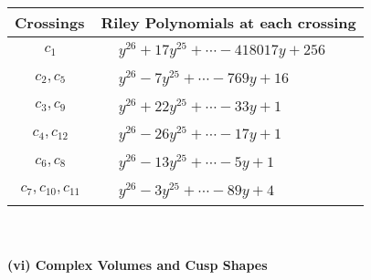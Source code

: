 \documentclass[1p]{elsarticle_modified}
\theoremstyle{definition}
\begin{document}
\begin{tabular}{m{50pt}|m{274pt}}
Crossings & \hspace{64pt}Riley Polynomials at each crossing \\
\hline $$\begin{aligned}c_{1}\end{aligned}$$&$\begin{aligned}
&y^{26}+17 y^{25}+\cdots-418017 y+256
\end{aligned}$\\
\hline $$\begin{aligned}c_{2},c_{5}\end{aligned}$$&$\begin{aligned}
&y^{26}-7 y^{25}+\cdots-769 y+16
\end{aligned}$\\
\hline $$\begin{aligned}c_{3},c_{9}\end{aligned}$$&$\begin{aligned}
&y^{26}+22 y^{25}+\cdots-33 y+1
\end{aligned}$\\
\hline $$\begin{aligned}c_{4},c_{12}\end{aligned}$$&$\begin{aligned}
&y^{26}-26 y^{25}+\cdots-17 y+1
\end{aligned}$\\
\hline $$\begin{aligned}c_{6},c_{8}\end{aligned}$$&$\begin{aligned}
&y^{26}-13 y^{25}+\cdots-5 y+1
\end{aligned}$\\
\hline $$\begin{aligned}c_{7},c_{10},c_{11}\end{aligned}$$&$\begin{aligned}
&y^{26}-3 y^{25}+\cdots-89 y+4
\end{aligned}$\\
\hline
\end{tabular}\\~\\
\newpage\flushleft \textbf{(vi) Complex Volumes and Cusp Shapes}
\end{document}
